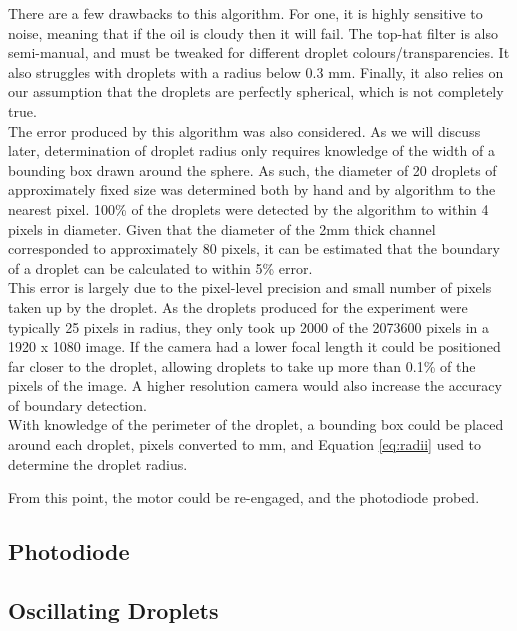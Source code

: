 \documentclass{physics_article_B}
\begin{document}
        There are a few drawbacks to this algorithm. For one, it is highly sensitive to noise, meaning that if the oil is cloudy then it will fail. The top-hat filter is also semi-manual, and must be tweaked for different droplet colours/transparencies. It also struggles with droplets with a radius below 0.3 mm. Finally, it also relies on our assumption that the droplets are perfectly spherical, which is not completely true.\\
        
        The error produced by this algorithm was also considered. As we will discuss later, determination of droplet radius only requires knowledge of the width of a bounding box drawn around the sphere. As such, the diameter of 20 droplets of approximately fixed size was determined both by hand and by algorithm to the nearest pixel. 100\% of the droplets were detected by the algorithm to within 4 pixels in diameter. Given that the diameter of the 2mm thick channel corresponded to approximately 80 pixels, it can be estimated that the boundary of a droplet can be calculated to within 5\% error. \\
        
        This error is largely due to the pixel-level precision and small number of pixels taken up by the droplet. As the droplets produced for the experiment were typically 25 pixels in radius, they only took up 2000 of the 2073600 pixels in a 1920 x 1080 image. If the camera had a lower focal length it could be positioned far closer to the droplet, allowing droplets to take up more than 0.1\% of the pixels of the image. A higher resolution camera would also increase the accuracy of boundary detection. \\
        
        With knowledge of the perimeter of the droplet, a bounding box could be placed around each droplet, pixels converted to mm, and Equation \ref{eq:radii} used to determine the droplet radius.
        
        From this point, the motor could be re-engaged, and the photodiode probed.
    
    \subsection{Photodiode}
    
    \subsection{Oscillating Droplets}
\end{document}
